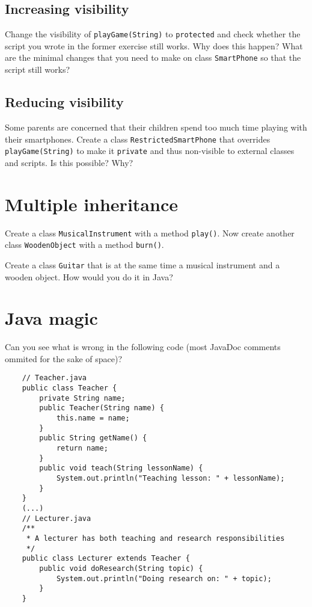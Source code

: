 \documentclass{article}
\begin{document}
\subsection{Increasing visibility}
\label{sec:incr-visib}

Change the visibility of \verb+playGame(String)+ to
\verb+protected+ and check whether the script you wrote in the former
exercise still works. Why does this happen? What are the minimal
changes that you need to make on
class \verb+SmartPhone+ so that the script still works? 

\subsection{Reducing visibility}
\label{sec:reducing-visibility}

Some parents are concerned that their children spend too much time
playing with their smartphones. Create a class
\verb+RestrictedSmartPhone+ that overrides \verb+playGame(String)+ to
make it \verb+private+ and thus non-visible to external classes and
scripts. Is this possible? Why?

\section{Multiple inheritance}
\label{sec:multiple-inheritance}

Create a class \verb+MusicalInstrument+ with a method
\verb+play()+. Now create another class \verb+WoodenObject+ with a
method \verb+burn()+.

Create a class \verb+Guitar+ that is at the same time a musical
instrument and a wooden object. How would you do it in Java?

\section{Java magic}
\label{sec:java-magic}

Can you see what is wrong in the following code (most JavaDoc comments
ommited for the sake of space)? 

\begin{verbatim}
    // Teacher.java
    public class Teacher {
        private String name; 
        public Teacher(String name) {
            this.name = name;
        }
        public String getName() {
            return name;
        }
        public void teach(String lessonName) {
            System.out.println("Teaching lesson: " + lessonName);
        }
    }
    (...) 
    // Lecturer.java
    /**
     * A lecturer has both teaching and research responsibilities
     */
    public class Lecturer extends Teacher {
        public void doResearch(String topic) {
            System.out.println("Doing research on: " + topic);
        }
    }
\end{verbatim}
\end{document}
